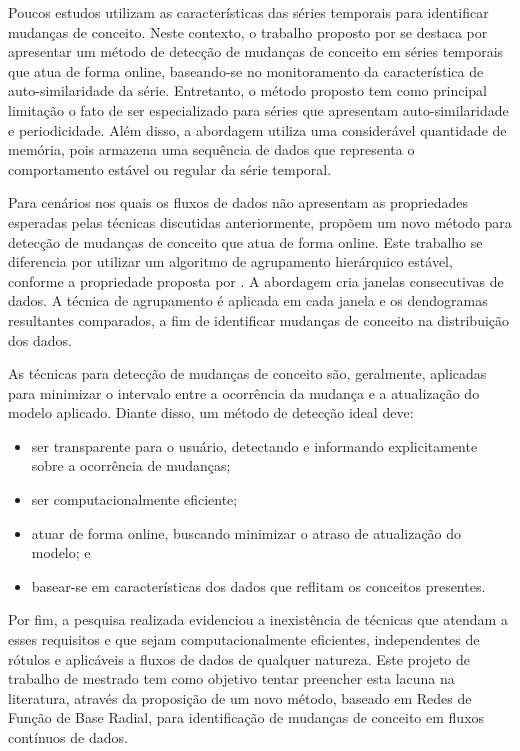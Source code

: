 \documentclass[msc, classic, a4paper]{ufbathesis}
\begin{document}
Poucos estudos utilizam as características das séries temporais para identificar mudanças de conceito. Neste contexto, o trabalho proposto por   se destaca por apresentar um método de detecção de mudanças de conceito em séries temporais que atua de forma online, baseando-se no monitoramento da característica de auto-similaridade da série.
Entretanto, o método proposto tem como principal limitação o fato de ser especializado para séries que apresentam auto-similaridade e periodicidade. Além disso, a abordagem utiliza uma considerável quantidade de memória, pois armazena uma sequência de dados que representa o comportamento estável ou regular da série temporal.

Para cenários nos quais os fluxos de dados não apresentam as propriedades esperadas pelas técnicas discutidas anteriormente,  propõem um novo método para detecção de mudanças de conceito que atua de forma online.
Este trabalho se diferencia por utilizar um algoritmo de agrupamento hierárquico estável, conforme a propriedade proposta por .
A abordagem cria janelas consecutivas de dados. A técnica de agrupamento é aplicada em cada janela e os dendogramas resultantes comparados, a fim de identificar mudanças de conceito na distribuição dos dados.

As técnicas para detecção de mudanças de conceito são, geralmente, aplicadas para minimizar o intervalo entre a ocorrência da mudança e a atualização do modelo aplicado. Diante disso, um método de detecção ideal deve:

\begin{itemize}
    \item ser transparente para o usuário, detectando e informando explicitamente sobre a ocorrência de mudanças;
    \item ser computacionalmente eficiente;
    \item atuar de forma online, buscando minimizar o atraso de atualização do modelo; e
    \item basear-se em características dos dados que reflitam os conceitos presentes.
\end{itemize}

Por fim, a pesquisa realizada evidenciou a inexistência de técnicas que atendam a esses requisitos e que sejam computacionalmente eficientes, independentes de rótulos e aplicáveis a fluxos de dados de qualquer natureza. Este projeto de trabalho de mestrado tem como objetivo tentar preencher esta lacuna na literatura, através da proposição de um novo método, baseado em Redes de Função de Base Radial,  para identificação de mudanças de conceito em fluxos contínuos de dados.
\end{document}
